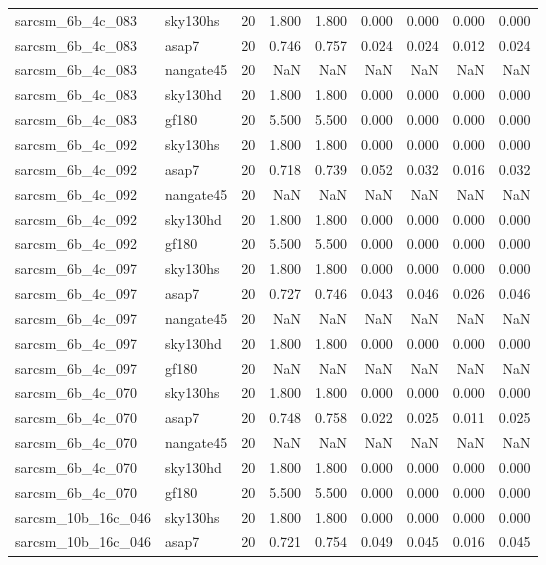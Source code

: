 \begin{tabular}{llrrrrrrr}
sarcsm\_6b\_4c\_083 & sky130hs & 20 & 1.800 & 1.800 & 0.000 & 0.000 & 0.000 & 0.000 \\
sarcsm\_6b\_4c\_083 & asap7 & 20 & 0.746 & 0.757 & 0.024 & 0.024 & 0.012 & 0.024 \\
sarcsm\_6b\_4c\_083 & nangate45 & 20 & NaN & NaN & NaN & NaN & NaN & NaN \\
sarcsm\_6b\_4c\_083 & sky130hd & 20 & 1.800 & 1.800 & 0.000 & 0.000 & 0.000 & 0.000 \\
sarcsm\_6b\_4c\_083 & gf180 & 20 & 5.500 & 5.500 & 0.000 & 0.000 & 0.000 & 0.000 \\
sarcsm\_6b\_4c\_092 & sky130hs & 20 & 1.800 & 1.800 & 0.000 & 0.000 & 0.000 & 0.000 \\
sarcsm\_6b\_4c\_092 & asap7 & 20 & 0.718 & 0.739 & 0.052 & 0.032 & 0.016 & 0.032 \\
sarcsm\_6b\_4c\_092 & nangate45 & 20 & NaN & NaN & NaN & NaN & NaN & NaN \\
sarcsm\_6b\_4c\_092 & sky130hd & 20 & 1.800 & 1.800 & 0.000 & 0.000 & 0.000 & 0.000 \\
sarcsm\_6b\_4c\_092 & gf180 & 20 & 5.500 & 5.500 & 0.000 & 0.000 & 0.000 & 0.000 \\
sarcsm\_6b\_4c\_097 & sky130hs & 20 & 1.800 & 1.800 & 0.000 & 0.000 & 0.000 & 0.000 \\
sarcsm\_6b\_4c\_097 & asap7 & 20 & 0.727 & 0.746 & 0.043 & 0.046 & 0.026 & 0.046 \\
sarcsm\_6b\_4c\_097 & nangate45 & 20 & NaN & NaN & NaN & NaN & NaN & NaN \\
sarcsm\_6b\_4c\_097 & sky130hd & 20 & 1.800 & 1.800 & 0.000 & 0.000 & 0.000 & 0.000 \\
sarcsm\_6b\_4c\_097 & gf180 & 20 & NaN & NaN & NaN & NaN & NaN & NaN \\
sarcsm\_6b\_4c\_070 & sky130hs & 20 & 1.800 & 1.800 & 0.000 & 0.000 & 0.000 & 0.000 \\
sarcsm\_6b\_4c\_070 & asap7 & 20 & 0.748 & 0.758 & 0.022 & 0.025 & 0.011 & 0.025 \\
sarcsm\_6b\_4c\_070 & nangate45 & 20 & NaN & NaN & NaN & NaN & NaN & NaN \\
sarcsm\_6b\_4c\_070 & sky130hd & 20 & 1.800 & 1.800 & 0.000 & 0.000 & 0.000 & 0.000 \\
sarcsm\_6b\_4c\_070 & gf180 & 20 & 5.500 & 5.500 & 0.000 & 0.000 & 0.000 & 0.000 \\
sarcsm\_10b\_16c\_046 & sky130hs & 20 & 1.800 & 1.800 & 0.000 & 0.000 & 0.000 & 0.000 \\
sarcsm\_10b\_16c\_046 & asap7 & 20 & 0.721 & 0.754 & 0.049 & 0.045 & 0.016 & 0.045 \\

\end{tabular}
